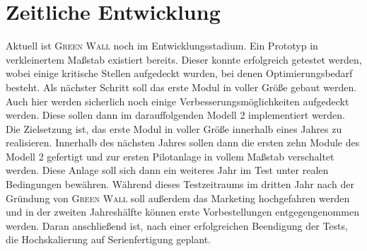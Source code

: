 \chapter{Zeitliche Entwicklung}\label{sec:zeitliche entwicklung}

    Aktuell ist \textsc{Green Wall} noch im Entwicklungsstadium.
    Ein Prototyp in verkleinertem Maßstab existiert bereits.
    Dieser konnte erfolgreich getestet werden, wobei einige kritische Stellen aufgedeckt wurden, bei denen Optimierungsbedarf besteht.
    Als nächster Schritt soll das erste Modul in voller Größe gebaut werden.
    Auch hier werden sicherlich noch einige Verbesserungsmöglichkeiten aufgedeckt werden.
    Diese sollen dann im darauffolgenden Modell 2 implementiert werden.
    Die Zielsetzung ist, das erste Modul in voller Größe innerhalb eines Jahres zu realisieren.
    Innerhalb des nächsten Jahres sollen dann die ersten zehn Module des Modell 2 gefertigt und zur ersten Pilotanlage in vollem Maßstab verschaltet werden.
    Diese Anlage soll sich dann ein weiteres Jahr im Test unter realen Bedingungen bewähren.
    Während dieses Testzeitraums im dritten Jahr nach der Gründung von \textsc{Green Wall} soll außerdem das Marketing hochgefahren werden und in der zweiten Jahreshälfte können erste Vorbestellungen entgegengenommen werden.
    Daran anschließend ist, nach einer erfolgreichen Beendigung der Tests, die Hochskalierung auf Serienfertigung geplant.